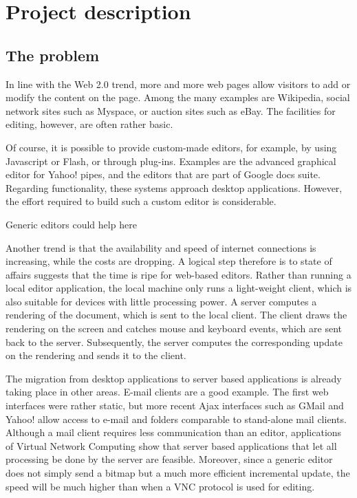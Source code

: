 \documentclass[10pt]{article}
\begin{document}
\ec



\bc
\section{Project description}

\subsection{The problem} 

In line with the Web 2.0 trend, more and more web pages allow visitors to add or modify the content on the page. Among the many examples are Wikipedia, social network sites such as Myspace, or auction sites such as eBay. The facilities for editing, however, are often rather basic. 

Of course, it is possible to provide custom-made editors, for example, by using Javascript or Flash, or through plug-ins. Examples are the advanced graphical editor for Yahoo! pipes, and the editors that are part of Google docs suite. Regarding functionality, these systems approach desktop applications. However, the effort required to build such a custom editor is considerable.

Generic editors could help here

Another trend is that the availability and speed of internet connections is increasing, while the costs are dropping. A logical step therefore is to state of affairs suggests that the time is ripe for web-based editors. Rather than running a local editor application, the local machine only runs a light-weight client, which is also suitable for devices with little processing power. A server computes a rendering of the document, which is sent to the local client. The client draws the rendering on the screen and catches mouse and keyboard events, which are sent back to the server. Subsequently, the server computes the corresponding update on the rendering and sends it to the client.

The migration from desktop applications to server based applications is already taking place in other areas. E-mail clients are a good example. The first web interfaces were rather static, but more recent Ajax interfaces such as GMail and Yahoo! allow access to e-mail and folders comparable to stand-alone mail clients. Although a mail client requires less communication than an editor, applications of Virtual Network Computing show that server based applications that let all processing be done by the server are feasible. Moreover, since a generic editor does not simply send a bitmap but a much more efficient incremental update, the speed will be much higher than when a VNC protocol is used for editing. 
\ec
\end{document}
